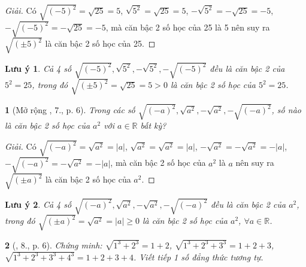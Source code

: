 \documentclass{article}
\newtheorem{baitoan}{}
\newtheorem{luuy}{Lưu ý}
\begin{document}
\begin{proof}[Giải]
	Có $\sqrt{(-5)^2} = \sqrt{25} = 5$, $\sqrt{5^2} = \sqrt{25} = 5$, $-\sqrt{5^2} = -\sqrt{25} = -5$, $-\sqrt{(-5)^2} = -\sqrt{25} = -5$, mà căn bậc 2 số học của 25 là 5 nên suy ra $\sqrt{(\pm5)^2}$ là căn bậc 2 số học của 25.
\end{proof}

\begin{luuy}
	Cả 4 số $\sqrt{(-5)^2},\sqrt{5^2},-\sqrt{5^2},-\sqrt{(-5)^2}$ đều là căn bậc 2 của $5^2 = 25$, trong đó $\sqrt{(\pm5)^2} = \sqrt{25} = 5 > 0$ là căn bậc 2 số học của $5^2 = 25$.
\end{luuy}

\begin{baitoan}[Mở rộng \cite{SBT_Toan_9_tap_1}, 7., p. 6]
	Trong các số $\sqrt{(-a)^2},\sqrt{a^2},-\sqrt{a^2},-\sqrt{(-a)^2}$, số nào là căn bậc 2 số học của $a^2$ với $a\in\mathbb{R}$ bất kỳ?
\end{baitoan}

\begin{proof}[Giải]
	Có $\sqrt{(-a)^2} = \sqrt{a^2} = |a|$, $\sqrt{a^2} = \sqrt{a^2} = |a|$, $-\sqrt{a^2} = -\sqrt{a^2} = -|a|$, $-\sqrt{(-a)^2} = -\sqrt{a^2} = -|a|$, mà căn bậc 2 số học của $a^2$ là $a$ nên suy ra $\sqrt{(\pm a)^2}$ là căn bậc 2 số học của $a^2$.
\end{proof}

\begin{luuy}
	Cả 4 số $\sqrt{(-a)^2},\sqrt{a^2},-\sqrt{a^2},-\sqrt{(-a)^2}$ đều là căn bậc 2 của $a^2$, trong đó $\sqrt{(\pm a)^2} = \sqrt{a^2} = |a|\ge0$ là căn bậc 2 số học của $a^2$, $\forall a\in\mathbb{R}$.
\end{luuy}

\begin{baitoan}[\cite{SBT_Toan_9_tap_1}, 8., p. 6]
	Chứng minh: $\sqrt{1^3 + 2^3} = 1 + 2$, $\sqrt{1^3 + 2^3 + 3^3} = 1 + 2 + 3$, $\sqrt{1^3 + 2^3 + 3^3 + 4^3} = 1 + 2 + 3 + 4$. Viết tiếp 1 số đẳng thức tương tự. 
\end{baitoan}
\end{document}
